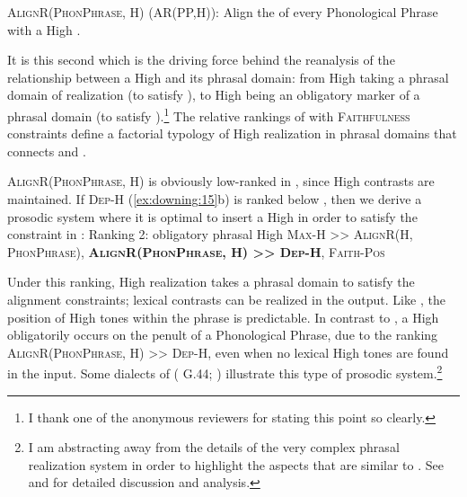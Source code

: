 \documentclass[output=paper,newtxmath,modfonts,nonflat,draft]{langsci/langscibook}
\begin{document}
\ea\label{ex:downing:20}\textsc{AlignR(PhonPhrase, H}) (AR(PP,H)):
Align the  of every Phonological Phrase with a High .
\z

It is this second  which is the driving force behind the reanalysis of the relationship between a High  and its phrasal domain: from High  taking a phrasal domain of realization (to satisfy ), to High  being an obligatory marker of a phrasal domain (to satisfy ).\footnote{I thank one of the anonymous reviewers for stating this point so clearly.} The relative rankings of  with \textsc{Faithfulness} constraints define a factorial typology of High  realization in phrasal domains that connects  and .

\textsc{AlignR(PhonPhrase, H}) is obviously low-ranked in , since High  contrasts are maintained. If \textsc{Dep-H} (\ref{ex:downing:15}b) is ranked below , then we derive a prosodic system where it is optimal to insert a High  in order to satisfy the constraint in :
\ea\label{ex:downing:21} Ranking 2: obligatory phrasal High 
\sn
\textsc{Max-H >> AlignR(H, PhonPhrase}), \textbf{\textsc{AlignR(PhonPhrase, H}}\textbf{) \textsc{>> Dep-H}}\textsc{, Faith-Pos}
\z

Under this ranking, High  realization takes a phrasal domain to satisfy the alignment constraints; lexical  contrasts can be realized in the output. Like , the position of High tones within the phrase is predictable. In contrast to , a High  obligatorily occurs on the penult of a Phonological Phrase, due to the ranking \textsc{AlignR(PhonPhrase, H}) >> \textsc{Dep-H}, even when no lexical High tones are found in the input. Some dialects of  ( G.44; \citealt{Cassimjee&Kisseberth1998,Patin2017}) illustrate this type of prosodic system.\footnote{I am abstracting away from the details of the very complex  phrasal  realization system in order to highlight the aspects that are similar to . See \citet{Cassimjee&Kisseberth1998,Patin2007,Patin2017} and \citet{Philipson2005} for detailed discussion and analysis.}
\end{document}
